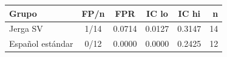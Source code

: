 \begin{tabular}{lccccr}
\toprule
Grupo & FP/n & FPR & IC lo & IC hi & n \\
\midrule
Jerga SV & 1/14 & 0.0714 & 0.0127 & 0.3147 & 14 \\
Español estándar & 0/12 & 0.0000 & 0.0000 & 0.2425 & 12 \\
\bottomrule
\end{tabular}

